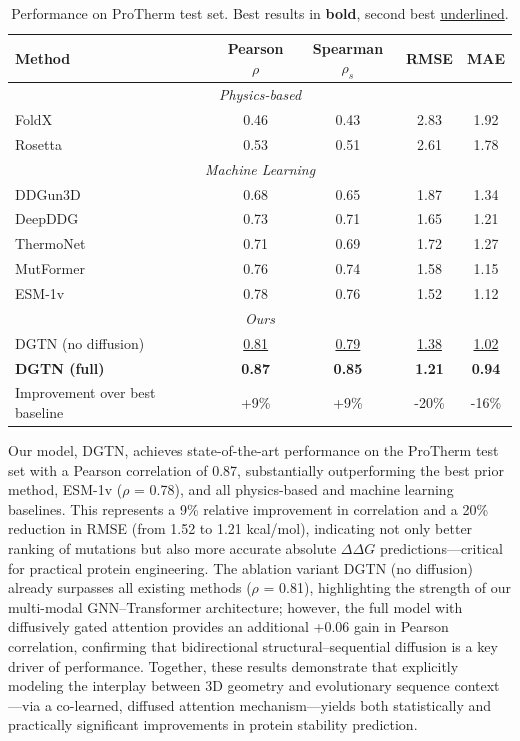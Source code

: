 \documentclass[11pt]{article}
\begin{document}
\begin{table}[htbp]
\centering
\caption{Performance on ProTherm test set. Best results in \textbf{bold}, second best \underline{underlined}.}
\label{tab:main_results}
\begin{tabular}{lcccc}
\toprule
\textbf{Method} & \textbf{Pearson} $\rho$ & \textbf{Spearman} $\rho_s$ & \textbf{RMSE} & \textbf{MAE} \\
\midrule
\multicolumn{5}{c}{\textit{Physics-based}} \\
FoldX & 0.46 & 0.43 & 2.83 & 1.92 \\
Rosetta & 0.53 & 0.51 & 2.61 & 1.78 \\
\midrule
\multicolumn{5}{c}{\textit{Machine Learning}} \\
DDGun3D & 0.68 & 0.65 & 1.87 & 1.34 \\
DeepDDG & 0.73 & 0.71 & 1.65 & 1.21 \\
ThermoNet & 0.71 & 0.69 & 1.72 & 1.27 \\
MutFormer & 0.76 & 0.74 & 1.58 & 1.15 \\
ESM-1v & 0.78 & 0.76 & 1.52 & 1.12 \\
\midrule
\multicolumn{5}{c}{\textit{Ours}} \\
DGTN (no diffusion) & \underline{0.81} & \underline{0.79} & \underline{1.38} & \underline{1.02} \\
\textbf{DGTN (full)} & \textbf{0.87} & \textbf{0.85} & \textbf{1.21} & \textbf{0.94} \\
\midrule
Improvement over best baseline & +9\% & +9\% & -20\% & -16\% \\
\bottomrule
\end{tabular}
\end{table}

Our model, DGTN, achieves state-of-the-art performance on the ProTherm
test set with a Pearson correlation of 0.87, substantially outperforming the
best prior method, ESM-1v ($\rho$ = 0.78), and all physics-based and machine
learning baselines. This represents a 9\% relative improvement in correlation
and a 20\% reduction in RMSE (from 1.52 to 1.21 kcal/mol), indicating not only
better ranking of mutations but also more accurate absolute $\Delta \Delta G$
predictions—critical for practical protein engineering. The ablation variant
DGTN (no diffusion) already surpasses all existing methods ($\rho$ = 0.81),
highlighting the strength of our multi-modal GNN–Transformer architecture;
however, the full model with diffusively gated attention provides an additional
+0.06 gain in Pearson correlation, confirming that bidirectional
structural–sequential diffusion is a key driver of performance. Together, these
results demonstrate that explicitly modeling the interplay between 3D geometry
and evolutionary sequence context—via a co-learned, diffused attention
mechanism—yields both statistically and practically significant improvements in
protein stability prediction.
\end{document}
